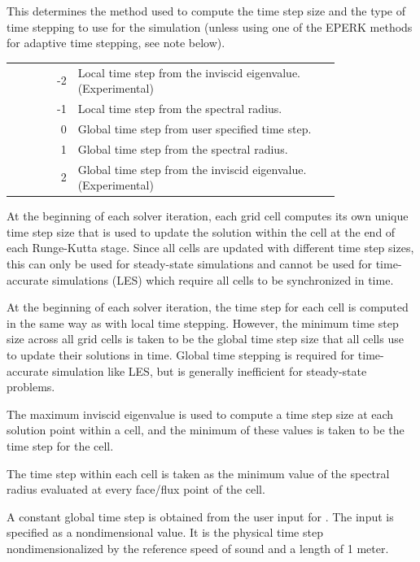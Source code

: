 \nopagebreak
\begin{nmldescbody}
This determines the method used to compute the time step size and the type of
time stepping to use for the simulation (unless using one of the EPERK methods
for adaptive time stepping, see note below).
%
\\
\begin{tabular}{ @{\qquad} r @{ = } p{0.80\linewidth} @{} }
  -2 & Local time step from the inviscid eigenvalue. (Experimental) \\
  -1 & Local time step from the spectral radius. \\
   0 & Global time step from user specified time step. \\
   1 & Global time step from the spectral radius. \\
   2 & Global time step from the inviscid eigenvalue.  (Experimental)
\end{tabular}
 
\begin{InputList}[font=\mdseries]
  \item[Local time stepping:]
    At the beginning of each solver iteration, each grid cell computes its own
    unique time step size that is used to update the solution within the cell at
    the end of each Runge-Kutta stage.
    Since all cells are updated with different time step sizes, this can only be
    used for steady-state simulations and cannot be used for time-accurate
    simulations (\forexample LES) which require all cells to be synchronized in
    time.
  \item[Global time stepping:]
    At the beginning of each solver iteration, the time step for each cell is
    computed in the same way as with local time stepping.
    However, the minimum time step size across all grid cells is taken to be the
    global time step size that all cells use to update their solutions in time.
    Global time stepping is required for time-accurate simulation like LES, but
    is generally inefficient for steady-state problems.
  \item[Inviscid eigenvalue:]
    The maximum inviscid eigenvalue is used to compute a time step size at
    each solution point within a cell, and the minimum of these values is
    taken to be the time step for the cell.
  \item[Spectral radius:]
    The time step within each cell is taken as the minimum value of the
    spectral radius evaluated at every face\slash flux point of the cell.
  \item[User specified time step:]
    A constant global time step is obtained from the user input for
    .
    \NOTE The input  is specified as a nondimensional value.
    It is the physical time step nondimensionalized by the reference speed of
    sound and a length of 1 meter.
%
\end{InputList}


\end{nmldescbody}
